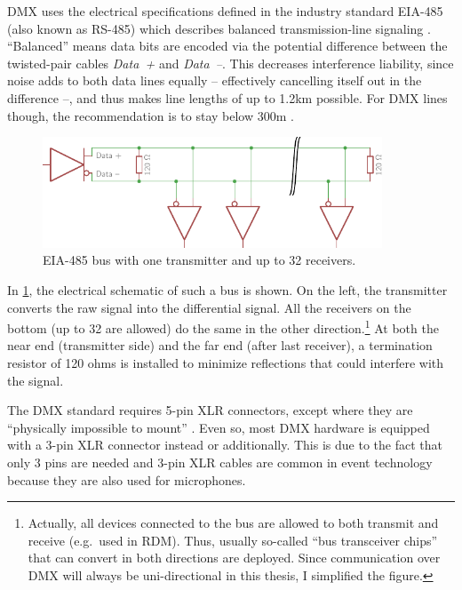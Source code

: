 DMX uses the electrical specifications defined in the industry standard
EIA-485 (also known as RS-485) which describes balanced
transmission-line signaling \citep{texas-instruments-eia-485}.
``Balanced'' means data bits are encoded via the potential difference
between the twisted-pair cables \emph{Data~+} and \emph{Data~--}. This
decreases interference liability, since noise adds to both data lines
equally -- effectively cancelling itself out in the difference --, and
thus makes line lengths of up to 1.2km possible. For DMX lines though,
the recommendation is to stay below 300m \citep{bennette-practice}.

\begin{figure}
\centering
\includegraphics[width=0.90000\textwidth]{Bilder/eia-485-bus.pdf}
\caption[EIA-485 bus with one transmitter and up to 32
receivers]{EIA-485 bus with one transmitter and up to 32
receivers.}\label{fig:eia-485-bus}
\end{figure}

In \cref{fig:eia-485-bus}, the electrical schematic of such a bus is
shown. On the left, the transmitter converts the raw signal into the
differential signal. All the receivers on the bottom (up to 32 are
allowed) do the same in the other direction.\footnote{Actually, all
  devices connected to the bus are allowed to both transmit and receive
  (e.g.~used in RDM). Thus, usually so-called ``bus transceiver chips''
  that can convert in both directions are deployed. Since communication
  over DMX will always be uni-directional in this thesis, I simplified
  the figure.} At both the near end (transmitter side) and the far end
(after last receiver), a termination resistor of 120 ohms is installed
to minimize reflections that could interfere with the signal.

The DMX standard requires 5-pin XLR connectors, except where they are
``physically impossible to mount'' \citep{esta-dmx512-a}. Even so, most
DMX hardware is equipped with a 3-pin XLR connector instead or
additionally. This is due to the fact that only 3 pins are needed and
3-pin XLR cables are common in event technology because they are also
used for microphones.

